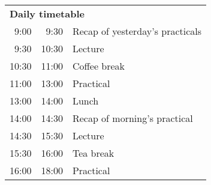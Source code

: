 \noindent
\begin{tabular}{r@{ -- }rp{13cm}}
\multicolumn{3}{l}{\bf Daily timetable} \\
 9:00 &  9:30 & Recap of yesterday's practicals \\
 9:30 & 10:30 & Lecture \\
10:30 & 11:00 & Coffee break \\
11:00 & 13:00 & Practical \\
13:00 & 14:00 & Lunch \\
14:00 & 14:30 & Recap of morning's practical \\
14:30 & 15:30 & Lecture \\
15:30 & 16:00 & Tea break \\
16:00 & 18:00 & Practical \\[2em]
\end{tabular}

